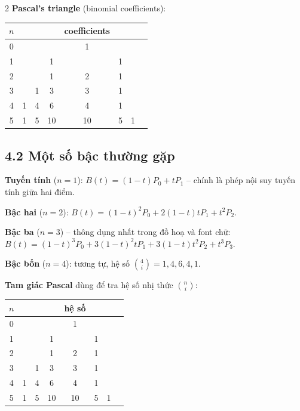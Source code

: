 \begin{paracol}{2}
\textbf{Pascal's triangle} (binomial coefficients):
\begin{center}\small
\begin{tabular}{c|ccccccc}
$n$ & & & & coefficients & & & \\\midrule
0 & & & & 1 & & & \\
1 & & & 1 & & 1 & & \\
2 & & & 1 & 2 & 1 & & \\
3 & & 1 & 3 & 3 & 1 & & \\
4 & 1 & 4 & 6 & 4 & 1 & & \\
5 & 1 & 5 & 10 & 10 & 5 & 1 & \\
\end{tabular}
\end{center}

\switchcolumn

\subsection*{4.2 Một số bậc thường gặp}

\textbf{Tuyến tính} ($n=1$): $B(t)=(1-t)P_0+tP_1$ -- chính là phép nội suy tuyến tính giữa hai điểm.

\textbf{Bậc hai} ($n=2$):
$B(t)=(1-t)^{2}P_0+2(1-t)tP_1+t^{2}P_2$.

\textbf{Bậc ba} ($n=3$) -- thông dụng nhất trong đồ hoạ và font chữ:
$B(t)=(1-t)^{3}P_0+3(1-t)^{2}tP_1+3(1-t)t^{2}P_2+t^{3}P_3$.

\textbf{Bậc bốn} ($n=4$): tương tự, hệ số $\binom{4}{i}=1,4,6,4,1$.

\textbf{Tam giác Pascal} dùng để tra hệ số nhị thức $\binom{n}{i}$:
\begin{center}\small
\begin{tabular}{c|ccccccc}
$n$ & & & & hệ số & & & \\\midrule
0 & & & & 1 & & & \\
1 & & & 1 & & 1 & & \\
2 & & & 1 & 2 & 1 & & \\
3 & & 1 & 3 & 3 & 1 & & \\
4 & 1 & 4 & 6 & 4 & 1 & & \\
5 & 1 & 5 & 10 & 10 & 5 & 1 & \\
\end{tabular}
\end{center}

\switchcolumn*


\end{paracol}
